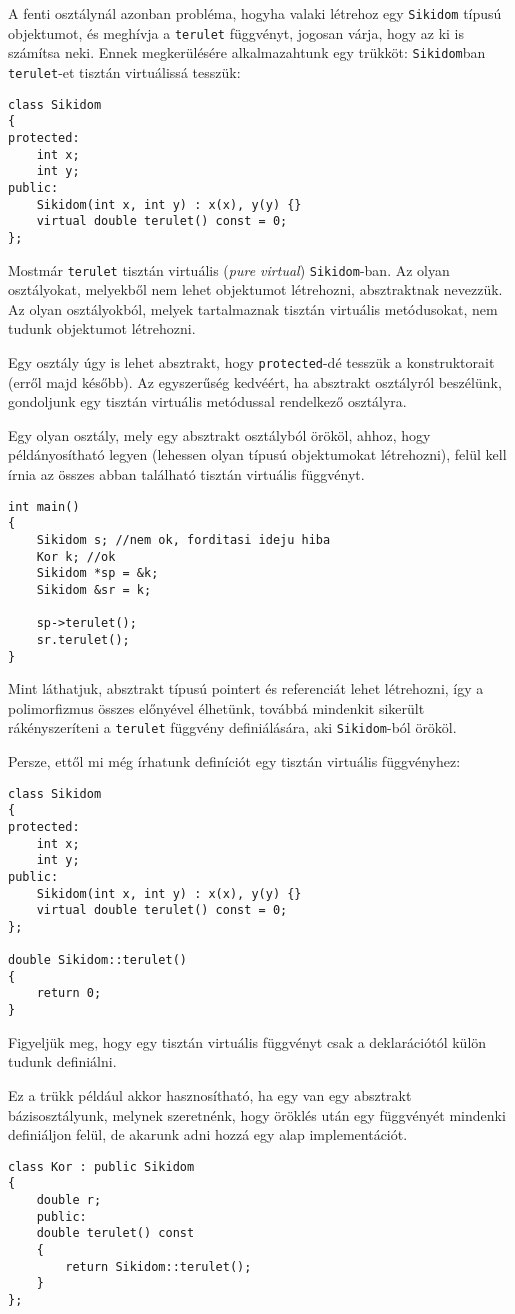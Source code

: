 \documentclass[a4paper,11.5pt,table]{article}
\begin{document}
	A fenti osztálynál azonban probléma, hogyha valaki létrehoz egy \texttt{Sikidom} típusú objektumot, és meghívja a \texttt{terulet} függvényt, jogosan várja, hogy az ki is számítsa neki. Ennek megkerülésére alkalmazahtunk egy trükköt: \texttt{Sikidom}ban \texttt{terulet}-et tisztán virtuálissá tesszük:
	
\begin{lstlisting}
class Sikidom
{
protected:
	int x;
	int y;
public:
	Sikidom(int x, int y) : x(x), y(y) {}
	virtual double terulet() const = 0;
};
\end{lstlisting}
	Mostmár \texttt{terulet} tisztán virtuális (\textit{pure virtual}) \texttt{Sikidom}-ban. Az olyan osztályokat, melyekből nem lehet objektumot létrehozni, absztraktnak nevezzük. Az olyan osztályokból, melyek tartalmaznak tisztán virtuális metódusokat, nem tudunk objektumot létrehozni.
	\begin{note}
		Egy osztály úgy is lehet absztrakt, hogy \texttt{protected}-dé tesszük a konstruktorait (erről majd később). Az egyszerűség kedvéért, ha absztrakt osztályról beszélünk, gondoljunk egy tisztán virtuális metódussal rendelkező osztályra.
	\end{note}
	Egy olyan osztály, mely egy absztrakt osztályból örököl, ahhoz, hogy példányosítható legyen (lehessen olyan típusú objektumokat létrehozni), felül kell írnia az összes abban található tisztán virtuális függvényt.
	\begin{lstlisting}
int main()
{
	Sikidom s; //nem ok, forditasi ideju hiba
	Kor k; //ok
	Sikidom *sp = &k;
	Sikidom &sr = k;
	
	sp->terulet();
	sr.terulet();
}
	\end{lstlisting}
	Mint láthatjuk, absztrakt típusú pointert és referenciát lehet létrehozni, így a polimorfizmus összes előnyével élhetünk, továbbá mindenkit sikerült rákényszeríteni a \texttt{terulet} függvény definiálására, aki \texttt{Sikidom}-ból örököl.
	
	Persze, ettől mi még írhatunk definíciót egy tisztán virtuális függvényhez:
\begin{lstlisting}
class Sikidom
{
protected:
	int x;
	int y;
public:
	Sikidom(int x, int y) : x(x), y(y) {}
	virtual double terulet() const = 0;
};

double Sikidom::terulet()
{
	return 0;
}
\end{lstlisting}
	Figyeljük meg, hogy egy tisztán virtuális függvényt csak a deklarációtól külön tudunk definiálni. 
	
	Ez a trükk például akkor hasznosítható, ha egy van egy absztrakt bázisosztályunk, melynek szeretnénk, hogy öröklés után egy függvényét mindenki definiáljon felül, de akarunk adni hozzá egy alap implementációt.
\begin{lstlisting}
class Kor : public Sikidom
{
	double r;
	public:
	double terulet() const
	{
		return Sikidom::terulet();
	}
};
\end{lstlisting}
	
\end{document}

